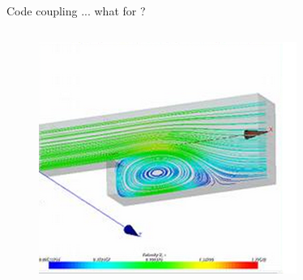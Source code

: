 \documentclass[10pt, hyperref={unicode=true,pdfusetitle, bookmarks=true,bookmarksnumbered=false,bookmarksopen=false, breaklinks=false,pdfborder={0 0 1},backref=true,colorlinks=true,linkcolor=darkblue,pageanchor, urlcolor=darkblue}]{beamer}
\begin{document}
\begin{frame}
\begin{block}{Code coupling ... what for ?}
\begin{columns}[c]
\begin{figure}[H]
\begin{centering}
\includegraphics[scale=0.5]{PICTURES/Image1.png}
\par\end{centering}
\end{figure}
\end{columns}

\end{block}
\end{frame}
\end{document}
